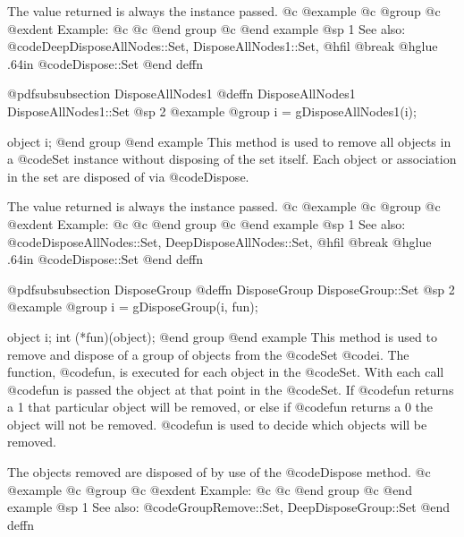 The value returned is always the instance passed.
@c @example
@c @group
@c @exdent Example:
@c 
@c @end group
@c @end example
@sp 1
See also:  @code{DeepDisposeAllNodes::Set, DisposeAllNodes1::Set,}
@hfil @break @hglue .64in      @code{Dispose::Set}
@end deffn


















@pdfsubsubsection {DisposeAllNodes1}
@deffn {DisposeAllNodes1} DisposeAllNodes1::Set
@sp 2
@example
@group
i = gDisposeAllNodes1(i);

object  i;
@end group
@end example
This method is used to remove all objects in a @code{Set} instance
without disposing of the set itself.  Each object or association in the
set are disposed of via @code{Dispose}.

The value returned is always the instance passed.
@c @example
@c @group
@c @exdent Example:
@c 
@c @end group
@c @end example
@sp 1
See also:  @code{DisposeAllNodes::Set, DeepDisposeAllNodes::Set,}
@hfil @break @hglue .64in      @code{Dispose::Set}
@end deffn














@pdfsubsubsection {DisposeGroup}
@deffn {DisposeGroup} DisposeGroup::Set
@sp 2
@example
@group
i = gDisposeGroup(i, fun);

object  i;
int     (*fun)(object);
@end group
@end example
This method is used to remove and dispose of a group of objects from the
@code{Set} @code{i}.  The function, @code{fun}, is executed for each object in
the @code{Set}.  With each call @code{fun} is passed the object at that point
in the @code{Set}.  If @code{fun} returns a 1 that particular object will be
removed, or else if @code{fun} returns a 0 the object will not be
removed.  @code{fun} is used to decide which objects will be removed.

The objects removed are disposed of by use of the @code{Dispose} method.
@c @example
@c @group
@c @exdent Example:
@c 
@c @end group
@c @end example
@sp 1
See also:  @code{GroupRemove::Set, DeepDisposeGroup::Set}
@end deffn














